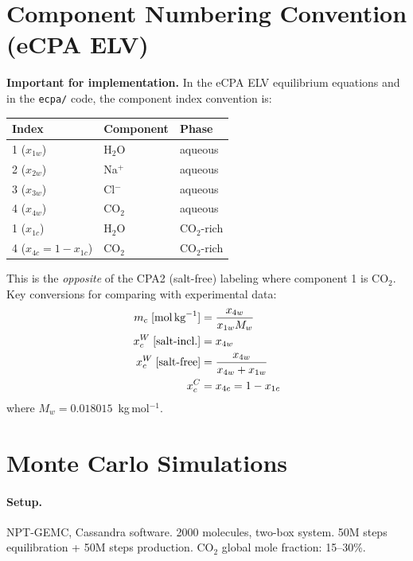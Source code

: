 \documentclass[11pt]{article}
\begin{document}
\section{Component Numbering Convention (eCPA ELV)}

\textbf{Important for implementation.} In the eCPA ELV equilibrium equations and in
the \texttt{ecpa/} code, the component index convention is:

\begin{center}
\begin{tabular}{lll}
  \toprule
  Index & Component & Phase \\ \midrule
  1 ($x_{1w}$) & H$_2$O & aqueous \\
  2 ($x_{2w}$) & Na$^+$ & aqueous \\
  3 ($x_{3w}$) & Cl$^-$ & aqueous \\
  4 ($x_{4w}$) & CO$_2$ & aqueous \\
  1 ($x_{1c}$) & H$_2$O & CO$_2$-rich \\
  4 ($x_{4c} = 1-x_{1c}$) & CO$_2$ & CO$_2$-rich \\
  \bottomrule
\end{tabular}
\end{center}

This is the \emph{opposite} of the CPA2 (salt-free) labeling where component 1 is CO$_2$.
Key conversions for comparing with experimental data:
\begin{align}
  m_c \; [\text{mol\,kg}^{-1}] &= \frac{x_{4w}}{x_{1w} M_w} \\
  x_c^W \; [\text{salt-incl.}] &= x_{4w} \\
  x_c^W \; [\text{salt-free}] &= \frac{x_{4w}}{x_{4w} + x_{1w}} \\
  x_c^C &= x_{4c} = 1 - x_{1c}
\end{align}
where $M_w = 0.018015$~kg\,mol$^{-1}$.

\section{Monte Carlo Simulations}

\paragraph{Setup.} NPT-GEMC, Cassandra software. 2000 molecules, two-box system.
50M steps equilibration + 50M steps production. CO$_2$ global mole fraction: 15--30\%.
\end{document}
